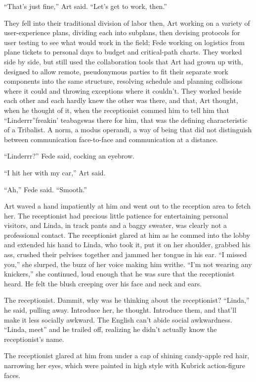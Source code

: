 “That’s just fine,” Art said. “Let’s get to work, then.”

They fell into their traditional division of labor then, Art
working on a variety of user-experience plans, dividing each into
subplans, then devising protocols for user testing to see what
would work in the field; Fede working on logistics from plane
tickets to personal days to budget and critical-path charts. They
worked side by side, but still used the collaboration tools that
Art had grown up with, designed to allow remote, pseudonymous
parties to fit their separate work components into the same
structure, resolving schedule and planning collisions where it
could and throwing exceptions where it couldn’t. They worked beside
each other and each hardly knew the other was there, and that, Art
thought, when he thought of it, when the receptionist commed him to
tell him that “Linderrr”{\dash}freakin’ teabags{\dash}was there for him, that
was the defining characteristic of a Tribalist. A norm, a modus
operandi, a way of being that did not distinguish between
communication face-to-face and communication at a distance.

“Linderrr?” Fede said, cocking an eyebrow.

“I hit her with my car,” Art said.

“Ah,” Fede said. “Smooth.”

Art waved a hand impatiently at him and went out to the reception
area to fetch her. The receptionist had precious little patience
for entertaining personal visitors, and Linda, in track pants and a
baggy sweater, was clearly not a professional contact. The
receptionist glared at him as he commed into the lobby and extended
his hand to Linda, who took it, put it on her shoulder, grabbed his
ass, crushed their pelvises together and jammed her tongue in his
ear. “I missed you,” she slurped, the buzz of her voice making him
writhe. “I’m not wearing any knickers,” she continued, loud enough
that he was sure that the receptionist heard. He felt the blush
creeping over his face and neck and ears.

The receptionist. Dammit, why was he thinking about the
receptionist? “Linda,” he said, pulling away. Introduce her, he
thought. Introduce them, and that’ll make it less socially awkward.
The English can’t abide social awkwardness. “Linda, meet{\dash}” and he
trailed off, realizing he didn’t actually know the receptionist’s
name.

The receptionist glared at him from under a cap of shining
candy-apple red hair, narrowing her eyes, which were painted in
high style with Kubrick action-figure faces.

